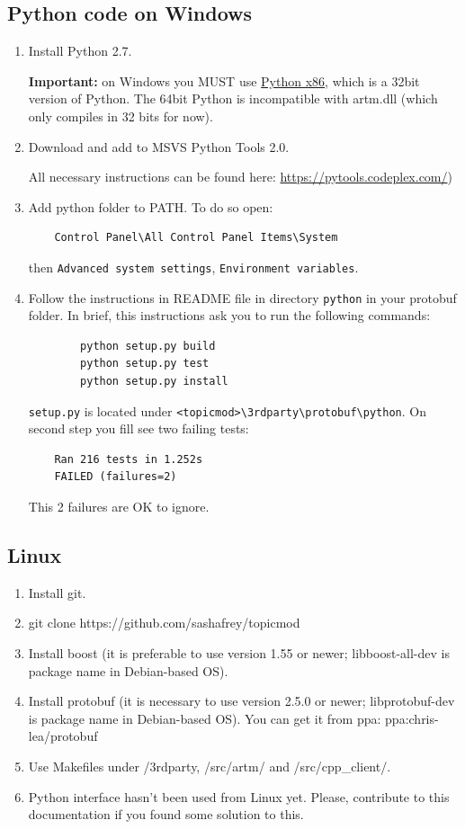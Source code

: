 \documentclass[11pt,a4paper,twoside]{report}
\begin{document}
\subsection{Python code on Windows}

\begin{enumerate}
	\item Install Python 2.7.

    {\bf Important:} on Windows you MUST use
    \href{https://www.python.org/ftp/python/2.7.6/python-2.7.6.msi}{Python x86},
    which is a 32bit version of Python. The 64bit Python is incompatible with artm.dll
    (which only compiles in 32 bits for now).

	\item Download and add to MSVS Python Tools 2.0.

    All necessary instructions can be found here:
	\url{https://pytools.codeplex.com/})
	\item Add python folder to PATH. To do so open:
\begin{verbatim}
    Control Panel\All Control Panel Items\System
\end{verbatim}
	then \verb'Advanced system settings', \verb'Environment variables'.
	\item Follow the instructions in README file in directory \verb'python'
    in your protobuf folder.
    In brief, this instructions ask you to run the following commands:
\begin{verbatim}
        python setup.py build
        python setup.py test
        python setup.py install
\end{verbatim}
    \verb'setup.py' is located under \verb'<topicmod>\3rdparty\protobuf\python'.
On second step you fill see two failing tests:
\begin{verbatim}
    Ran 216 tests in 1.252s
    FAILED (failures=2)
\end{verbatim}
    This 2 failures are OK to ignore.
\end{enumerate}

\subsection{Linux}

\begin{enumerate}
    \item Install git.
    \item git clone https://github.com/sashafrey/topicmod
    \item Install boost (it is preferable to use version 1.55 or newer; \hbox{libboost-all-dev} is package name in Debian-based OS).
    \item Install protobuf (it is necessary to use version 2.5.0 or newer; \hbox{libprotobuf-dev} is package name in Debian-based OS). You can get it from ppa: \hbox{ppa:chris-lea/protobuf}
    \item Use Makefiles under /3rdparty, /src/artm/ and /src/cpp\_client/.
    \item Python interface hasn't been used from Linux yet. Please, contribute to this documentation if you found some solution to this.
\end{enumerate}
\end{document}
